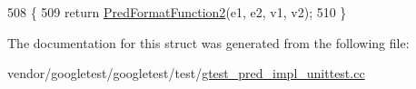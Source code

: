 \begin{DoxyCode}
508                                                           \{
509     \textcolor{keywordflow}{return} \hyperlink{gtest__pred__impl__unittest_8cc_ac47f2d44062a47c907d113375ec47d47}{PredFormatFunction2}(e1, e2, v1, v2);
510   \}
\end{DoxyCode}


The documentation for this struct was generated from the following file\+:\begin{DoxyCompactItemize}
\item 
vendor/googletest/googletest/test/\hyperlink{gtest__pred__impl__unittest_8cc}{gtest\+\_\+pred\+\_\+impl\+\_\+unittest.\+cc}\end{DoxyCompactItemize}
